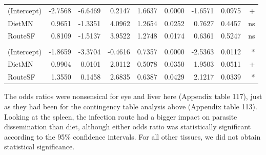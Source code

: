 \documentclass[
  12pt,
  letterpaper,
]{article}
\begin{document}
\begin{longtable}{l|rrrrrrrr}
(Intercept) & -2.7568 & -6.6469 & 0.2147 & 1.6637 & 0.0000 & -1.6571 & 0.0975 & + \\ 
DietMN & 0.9651 & -1.3351 & 4.0962 & 1.2654 & 0.0252 & 0.7627 & 0.4457 & ns \\ 
RouteSF & 0.8109 & -1.5137 & 3.9522 & 1.2748 & 0.0174 & 0.6361 & 0.5247 & ns \\ 
\midrule\addlinespace[2.5pt]
\multicolumn{9}{l}{Spleen} \\[2.5pt] 
\midrule\addlinespace[2.5pt]
(Intercept) & -1.8659 & -3.3704 & -0.4616 & 0.7357 & 0.0000 & -2.5363 & 0.0112 & * \\ 
DietMN & 0.9904 & 0.0101 & 2.0112 & 0.5078 & 0.0350 & 1.9503 & 0.0511 & + \\ 
RouteSF & 1.3550 & 0.1458 & 2.6835 & 0.6387 & 0.0429 & 2.1217 & 0.0339 & * \\ 
\bottomrule
\end{longtable}
\endgroup

The odds ratios were nonsensical for eye and liver here (Appendix table 117), just as they had been for the contingency table analysis above (Appendix table 113). Looking at the spleen, the infection route had a bigger impact on parasite dissemination than diet, although either odds ratio was statistically significant according to the 95\% confidence intervals. For all other tissues, we did not obtain statistical significance.
\end{document}
